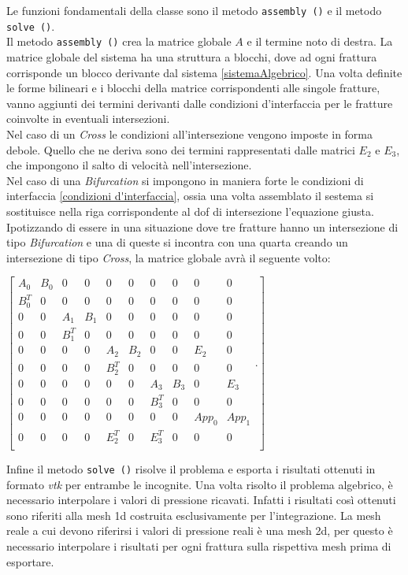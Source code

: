 Le funzioni fondamentali della classe sono il metodo \texttt{assembly ()} e il metodo \texttt{solve ()}. \\
\noindent Il metodo \texttt{assembly ()} crea la matrice globale $A$ e il termine noto di destra.
La matrice globale del sistema ha una struttura a blocchi, dove ad ogni frattura corrisponde un blocco derivante dal sistema \ref{sistemaAlgebrico}. Una volta definite le forme bilineari e i blocchi della matrice corrispondenti alle singole fratture, vanno aggiunti dei termini derivanti dalle condizioni d'interfaccia per le fratture coinvolte in eventuali intersezioni.\\
\noindent Nel caso di un \textit{Cross} le condizioni all'intersezione vengono imposte in forma debole. Quello che ne deriva sono dei termini rappresentati dalle matrici $E_{2}$ e $E_{3}$, che impongono il salto di velocità nell'intersezione.\\
\noindent Nel caso di una \textit{Bifurcation} si impongono in maniera forte le condizioni di interfaccia \ref{condizioni d'interfaccia}, ossia una volta assemblato il sestema si sostituisce nella riga corrispondente al dof di intersezione l'equazione giusta.\\
Ipotizzando di essere in una situazione dove tre fratture hanno un intersezione di tipo \textit{Bifurcation} e una di queste si incontra con una quarta creando un intersezione di tipo \textit{Cross}, la matrice globale avrà il seguente volto:\\
 \begin{center}
  $ \left[ \begin{matrix}
 			A_{0} &  B_{0} & 0 & 0 & 0 & 0 & 0 & 0 & 0 & 0\\ 
 			B_{0}^{T} & 0 & 0 & 0 & 0 & 0 & 0 & 0 & 0 & 0\\
 			0 & 0 & A_{1} &  B_{1} & 0 & 0 & 0 & 0 & 0 & 0 \\ 
		 	0 & 0 & B_{1}^{T} & 0 & 0 & 0 & 0 & 0 & 0 & 0 \\
		 	0 & 0 & 0 & 0 & A_{2} &  B_{2} & 0 & 0 & E_{2} & 0\\ 
		 	0 & 0 & 0 & 0 & B_{2}^{T} & 0 & 0 & 0 & 0 & 0\\
		 	0 & 0 & 0 & 0 & 0 & 0 & A_{3} &  B_{3} & 0 & E_{3} \\ 
 			0 & 0 & 0 & 0 & 0 & 0 & B_{3}^{T} & 0 & 0 & 0\\
 			0 & 0 & 0 & 0 & 0 & 0 & 0 & 0 & App_{0} & App_{1} \\
 			0 & 0 & 0 & 0 & E_{2}^{T} & 0 & E_{3}^{T} & 0 & 0 & 0\\
 			\end{matrix}.\right] $ 
  \end{center}
Infine il metodo \texttt{solve ()} risolve il problema e esporta i risultati ottenuti in formato \emph{vtk} per entrambe le incognite. Una volta risolto il problema algebrico, è necessario interpolare i valori di pressione ricavati. Infatti i risultati così ottenuti sono riferiti alla mesh 1d costruita esclusivamente per l'integrazione. La mesh reale a cui devono riferirsi i valori di pressione reali è una mesh 2d, per questo è necessario interpolare i risultati per ogni frattura sulla rispettiva mesh prima di esportare.\\

